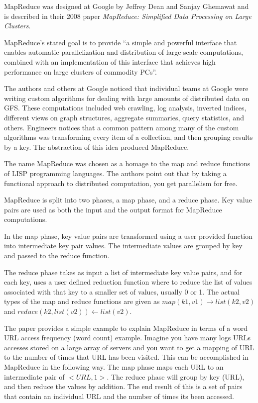 \documentclass[]{article}
\begin{document}
MapReduce was designed at Google by Jeffrey Dean and Sanjay Ghemawat and is described in their 2008 paper \textit{MapReduce: Simplified Data Processing on Large Clusters}\cite{dean2008mapreduce}.

MapReduce's stated goal is to provide ``a simple and powerful interface that enables automatic parallelization and distribution of large-scale computations, combined with an implementation of this interface that achieves high performance on large clusters of commodity PCs''. 

The authors and others at Google noticed that individual teams at Google were writing custom algorithms for dealing with large amounts of distributed data on GFS. These computations included web crawling, log analysis, inverted indices, different views on graph structures, aggregate summaries, query statistics, and others. Engineers notices that a common pattern among many of the custom algorithms was transforming every item of a collection, and then grouping results by a key. The abstraction of this idea produced MapReduce. 

The name MapReduce was chosen as a homage to the map and reduce functions of LISP programming languages. The authors point out that by taking a functional approach to distributed computation, you get parallelism for free.

MapReduce is split into two phases, a map phase, and a reduce phase. Key value pairs are used as both the input and the output format for MapReduce computations. 

In the map phase, key value pairs are transformed using a user provided function into intermediate key pair values. The intermediate values are grouped by key and passed to the reduce function.

The reduce phase takes as input a list of intermediate key value pairs, and for each key, uses a user defined reduction function where to reduce the list of values associated with that key to a smaller set of values, usually 0 or 1. The actual types of the map and reduce functions are given as $map(k1, v1)\longrightarrow list(k2,v2)$ and $reduce(k2, list(v2))\longleftarrow list(v2)$.

The paper provides a simple example to explain MapReduce in terms of a word URL access frequency (word count) example. Imagine you have many logs URLs accesses stored on a large array of servers and you want to get a mapping of URL to the number of times that URL has been visited. This can be accomplished in MapReduce in the following way. The map phase maps each URL to an intermediate pair of $<URL, 1>$. The reduce phase will group by key (URL), and then reduce the values by addition. The end result of this is a set of pairs that contain an individual URL and the number of times its been accessed.
\end{document}
